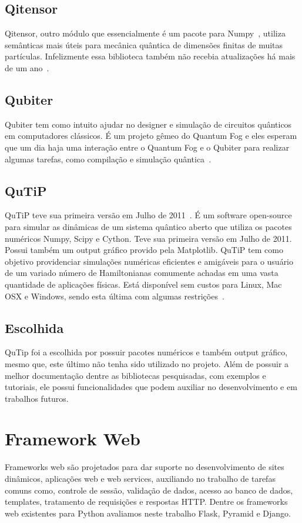 \documentclass[a4paper, 12pt, oneside]{book}
\begin{document}
\subsection{Qitensor}
Qitensor, outro módulo que essencialmente é um pacote para Numpy~\cite{numpy}, utiliza semânticas mais úteis para mecânica quântica de dimensões finitas de muitas partículas. Infelizmente essa biblioteca também não recebia atualizações há mais de um ano~\cite{qitensor}.
\subsection{Qubiter}
Qubiter tem como intuito ajudar no designer e simulação de circuitos quânticos em computadores clássicos. É um projeto gêmeo do Quantum Fog e eles esperam que um dia haja uma interação entre o Quantum Fog e o Qubiter para realizar algumas tarefas, como compilação e simulação quântica~\cite{qubiter}.	

\subsection{QuTiP}
QuTiP teve sua primeira versão em Julho de 2011~\cite{qutipchangelog}. É um software open-source para simular as dinâmicas de um sistema quântico aberto que utiliza os pacotes numéricos Numpy, Scipy e Cython. Teve sua primeira versão em Julho de 2011. Possui também um output gráfico provido pela Matplotlib. QuTiP tem como objetivo providenciar simulações numéricas eficientes e amigáveis para o usuário de um variado número de Hamiltonianas comumente achadas em uma vasta quantidade de aplicações físicas. Está disponível sem custos para Linux, Mac OSX e Windows, sendo esta última com algumas restrições~\cite{qutip.org}.

\subsection{Escolhida}
QuTip foi a escolhida por possuir pacotes numéricos e também output gráfico, mesmo que, este último não tenha sido utilizado no projeto. Além de possuir a melhor documentação dentre as bibliotecas pesquisadas, com exemplos e tutoriais, ele possui funcionalidades que podem auxiliar no desenvolvimento e em trabalhos futuros.

\section{Framework Web}
Frameworks web são projetados para dar suporte no desenvolvimento de sites dinâmicos, aplicações web e web services, auxiliando no trabalho de tarefas comuns como, controle de sessão, validação de dados, acesso ao banco de dados, templates, tratamento de requisições e respostas HTTP. Dentre os frameworks web existentes para Python avaliamos neste trabalho Flask, Pyramid e Django.
\end{document}
